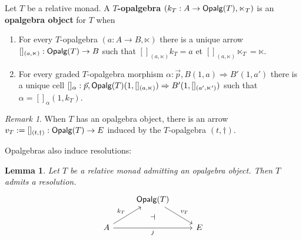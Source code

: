 \documentclass[10pt,a4paper]{article}
\newcommand{\cat}[1]{\textcat{#1}}
\newcommand{\textcat}[1]{{\normalfont\textsf{#1}}}
\newcommand{\To}{\Rightarrow}
\DeclareMathOperator{\Opalg}{\cat{Opalg}}
\theoremstyle{plain}
\newtheorem{lemma}[theorem]{Lemma}
\theoremstyle{definition}
\theoremstyle{remark}
\newtheorem{remark}[theorem]{Remark}
\begin{document}
\begin{definition}
    \label{def:opalg_obj}
    Let $T$ be a relative monad. A \textbf{$T$-opalgebra} $(k_T : A \to \Opalg(T), \ltimes_T)$ is an \textbf{opalgebra object} for $T$ when
    \begin{enumerate}
        \item For every $T$-opalgebra $(a : A \to B, \ltimes)$ there is a unique arrow $[]_{(a, \ltimes)} : \Opalg(T) \to B$ such that $[]_{(a, \ltimes)}k_T= a$ et $[]_{(a, \ltimes)}\ltimes_T = \ltimes$.
        \item For every graded $T$-opalgebra morphism $\alpha : \vec p, B(1, a) \To B'(1, a')$ there is a unique cell $[]_\alpha : \vec p, \Opalg(T)(1, []_{(a, \ltimes)}) \To B'(1, []_{(a', \ltimes')})$ such that $\alpha = []_\alpha(1, k_T)$.
    \end{enumerate}
\end{definition}

\begin{remark}
    When $T$ has an opalgebra object, there is an arrow $v_T := []_{(t, \dag)} : \Opalg(T) \to E$ induced by the $T$-opalgebra $(t, \dag)$.
\end{remark}

Opalgebras also induce resolutions:

\begin{lemma}
    Let $T$ be a relative monad admitting an opalgebra object. Then $T$ admits a resolution.
    \[\begin{tikzcd}
        & \Opalg(T) \ar[dr, "v_T"] &\\
        A \ar[ur, "k_T"] \ar[rr, "j"'] &{}& E
        \ar[from=1-2, to=2-2, phantom, "\dashv"{anchor=center}]
    \end{tikzcd}\]
\end{lemma}
\end{document}
